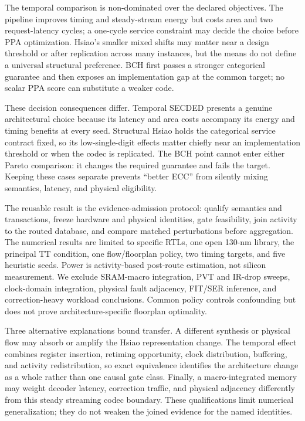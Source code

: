 \documentclass[conference,10pt]{IEEEtran}
\begin{document}
The temporal comparison is non-dominated over the declared objectives. The pipeline improves timing and steady-stream energy but costs area and two request-latency cycles; a one-cycle service constraint may decide the choice before PPA optimization. Hsiao's smaller mixed shifts may matter near a design threshold or after replication across many instances, but the means do not define a universal structural preference. BCH first passes a stronger categorical guarantee and then exposes an implementation gap at the common target; no scalar PPA score can substitute a weaker code.

These decision consequences differ. Temporal SECDED presents a genuine architectural choice because its latency and area costs accompany its energy and timing benefits at every seed. Structural Hsiao holds the categorical service contract fixed, so its low-single-digit effects matter chiefly near an implementation threshold or when the codec is replicated. The BCH point cannot enter either Pareto comparison: it changes the required guarantee and fails the target. Keeping these cases separate prevents ``better ECC'' from silently mixing semantics, latency, and physical eligibility.

The reusable result is the evidence-admission protocol: qualify semantics and transactions, freeze hardware and physical identities, gate feasibility, join activity to the routed database, and compare matched perturbations before aggregation. The numerical results are limited to specific RTLs, one open 130-nm library, the principal TT condition, one flow/floorplan policy, two timing targets, and five heuristic seeds. Power is activity-based post-route estimation, not silicon measurement. We exclude SRAM-macro integration, PVT and IR-drop sweeps, clock-domain integration, physical fault adjacency, FIT/SER inference, and correction-heavy workload conclusions. Common policy controls confounding but does not prove architecture-specific floorplan optimality.

Three alternative explanations bound transfer. A different synthesis or physical flow may absorb or amplify the Hsiao representation change. The temporal effect combines register insertion, retiming opportunity, clock distribution, buffering, and activity redistribution, so exact equivalence identifies the architecture change as a whole rather than one causal gate class. Finally, a macro-integrated memory may weight decoder latency, correction traffic, and physical adjacency differently from this steady streaming codec boundary. These qualifications limit numerical generalization; they do not weaken the joined evidence for the named identities.
\end{document}
